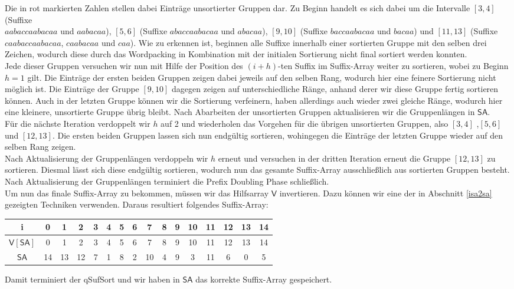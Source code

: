 Die in rot markierten Zahlen stellen dabei Einträge unsortierter Gruppen dar. 
Zu Beginn handelt es sich dabei um die Intervalle $[3,4]$ (Suffixe\\ $aabaccaabacaa$ und $aabacaa$), $[5,6]$ (Suffixe $abaccaabacaa$ und $abacaa$), $[9, 10]$ (Suffixe $baccaabacaa$ und $bacaa$) und $[11,13]$ (Suffixe $caabaccaabacaa$, $caabacaa$ und $caa$).
Wie zu erkennen ist, beginnen alle Suffixe innerhalb einer sortierten Gruppe mit den selben drei Zeichen, wodurch diese durch das Wordpacking in Kombination mit der initialen Sortierung nicht final sortiert werden konnten. \\
Jede dieser Gruppen versuchen wir nun mit Hilfe der Position des $(i+h)$-ten Suffix im Suffix-Array weiter zu sortieren, wobei zu Beginn $h=1$ gilt. 
Die Einträge der ersten beiden Gruppen zeigen dabei jeweils auf den selben Rang, wodurch hier eine feinere Sortierung nicht möglich ist. Die Einträge der Gruppe $[9,10]$ dagegen zeigen auf unterschiedliche Ränge, anhand derer wir diese Gruppe fertig sortieren können. Auch in der letzten Gruppe können wir die Sortierung verfeinern, haben allerdings auch wieder zwei gleiche Ränge, wodurch hier eine kleinere, unsortierte Gruppe übrig bleibt. Nach Abarbeiten der unsortierten Gruppen aktualisieren wir die Gruppenlängen in $\mathsf{SA}$.\\
Für die nächste Iteration verdoppelt wir $h$ auf 2 und wiederholen das Vorgehen für die übrigen unsortierten Gruppen, also $[3,4]$ ,$[5,6]$ und $[12,13]$. Die ersten beiden Gruppen lassen sich nun endgültig sortieren, wohingegen die Einträge der letzten Gruppe wieder auf den selben Rang zeigen.\\
Nach Aktualisierung der Gruppenlängen verdoppeln wir $h$ erneut und versuchen in der dritten Iteration erneut die Gruppe $[12,13]$ zu sortieren. Diesmal lässt sich diese endgültig sortieren, wodurch nun das gesamte Suffix-Array ausschließlich aus sortierten Gruppen besteht. Nach Aktualisierung der Gruppenlängen terminiert die Prefix Doubling Phase schließlich.\\
Um nun das finale Suffix-Array zu bekommen, müssen wir das Hilfsarray $\mathsf{V}$ invertieren. Dazu können wir eine der in Abschnitt \ref{isa2sa} gezeigten Techniken verwenden. Daraus resultiert folgendes Suffix-Array:

\begin{center}
\begin{tabular}{| c | c | c | c | c | c | c | c | c | c | c | c | c | c | c | c |}
\hline
i & 0 & 1 &2 &3 &4 &5 &6 &7 &8 &9 &10 &11 &12 &13 &14 \\
\hline
$\mathsf{V}[\mathsf{SA}]$ & 0 & 1 & 2 &  3 & 4 & 5 & 6 & 7 & 8 & 9 & 10 & 11 & 12 & 13 & 14 \\
$\mathsf{SA}$ & 14 & 13 & 12 & 7 & 1 & 8 & 2 & 10 & 4 & 9 & 3 & 11 & 6 & 0 & 5 \\
\hline
\end{tabular}
\end{center}

Damit terminiert der qSufSort und wir haben in $\mathsf{SA}$ das korrekte Suffix-Array gespeichert.